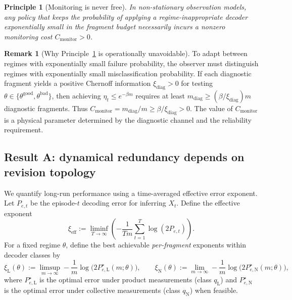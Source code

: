\documentclass[11pt]{article}
\newcommand{\1}{\mathbf{1}}
\newcommand{\QCBdist}{\xi}
\theoremstyle{definition}
\newtheorem{remark}{Remark}
\theoremstyle{plain}
\newtheorem{principle}{Principle}
\begin{document}
\begin{principle}[Monitoring is never free]
\label{prin:monitoring-positive}
In non-stationary observation models, any policy that keeps the probability of applying a regime-inappropriate decoder exponentially small in the fragment budget necessarily incurs a nonzero monitoring cost $C_{\mathrm{monitor}}>0$.
\end{principle}

\begin{remark}[Why Principle~\ref{prin:monitoring-positive} is operationally unavoidable]
To adapt between regimes with exponentially small failure probability, the observer must distinguish regimes with exponentially small misclassification probability.
If each diagnostic fragment yields a positive Chernoff information $\xi_{\mathrm{diag}}>0$ for testing $\theta\in\{\theta^{\mathrm{good}},\theta^{\mathrm{bad}}\}$, then achieving $\eta_t\le e^{-\beta m}$ requires at least $m_{\mathrm{diag}}\ge (\beta/\xi_{\mathrm{diag}})m$ diagnostic fragments.
Thus $C_{\mathrm{monitor}}=m_{\mathrm{diag}}/m\ge \beta/\xi_{\mathrm{diag}}>0$.
The value of $C_{\mathrm{monitor}}$ is a physical parameter determined by the diagnostic channel and the reliability requirement.
\end{remark}

\subsection{Result A: dynamical redundancy depends on revision topology}

We quantify long-run performance using a time-averaged effective error exponent.
Let $P_{e,t}$ be the episode-$t$ decoding error for inferring $X_t$.
Define the effective exponent
\begin{equation}
\QCBdist_{\mathrm{eff}}
:=
\liminf_{T\to\infty}
\left(
-\frac{1}{Tm}
\sum_{t=1}^{T}\log(2P_{e,t})
\right).
\label{eq:xi-eff}
\end{equation}
For a fixed regime $\theta$, define the best achievable \emph{per-fragment} exponents within decoder classes by
\[
\QCBdist_{\mathrm{L}}(\theta):=
\limsup_{m\to\infty}-\frac{1}{m}\log\!\bigl(2P_{e,\mathrm{L}}^\star(m;\theta)\bigr),
\qquad
\QCBdist_{\mathrm{N}}(\theta):=
\lim_{m\to\infty}-\frac{1}{m}\log\!\bigl(2P_{e,\mathrm{N}}^\star(m;\theta)\bigr),
\]
where $P_{e,\mathrm{L}}^\star$ is the optimal error under product measurements (class $q_{\mathrm{L}}$) and $P_{e,\mathrm{N}}^\star$ is the optimal error under collective measurements (class $q_{\mathrm{N}}$) when feasible.
\end{document}
